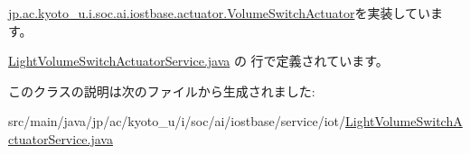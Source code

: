 \hyperlink{interfacejp_1_1ac_1_1kyoto__u_1_1i_1_1soc_1_1ai_1_1iostbase_1_1actuator_1_1_volume_switch_actuator_ab31aa1743348eb4d3cbc2844f9a17ae2}{jp.\-ac.\-kyoto\-\_\-u.\-i.\-soc.\-ai.\-iostbase.\-actuator.\-Volume\-Switch\-Actuator}を実装しています。



 \hyperlink{_light_volume_switch_actuator_service_8java_source}{Light\-Volume\-Switch\-Actuator\-Service.\-java} の  行で定義されています。



このクラスの説明は次のファイルから生成されました\-:\begin{DoxyCompactItemize}
\item 
src/main/java/jp/ac/kyoto\-\_\-u/i/soc/ai/iostbase/service/iot/\hyperlink{_light_volume_switch_actuator_service_8java}{Light\-Volume\-Switch\-Actuator\-Service.\-java}\end{DoxyCompactItemize}

